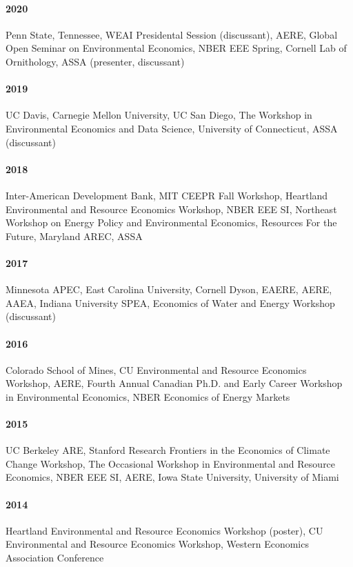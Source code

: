 \documentclass{res} %
\begin{document}
\begin{resume}
\paragraph{2020} Penn State, Tennessee, WEAI Presidental Session (discussant), AERE, Global Open Seminar on Environmental Economics, NBER EEE Spring, Cornell Lab of Ornithology, ASSA (presenter, discussant) \vspace{-.3in}
\paragraph{2019} UC Davis, Carnegie Mellon University, UC San Diego, The Workshop in Environmental Economics and Data Science, University of Connecticut, ASSA (discussant) \vspace{-.3in}
\paragraph{2018} Inter-American Development Bank, MIT CEEPR Fall Workshop, Heartland Environmental and Resource Economics Workshop, NBER EEE SI, Northeast Workshop on Energy Policy and Environmental Economics, Resources For the Future, Maryland AREC, ASSA \vspace{-.3in}
\paragraph{2017} Minnesota APEC, East Carolina University, Cornell Dyson, EAERE, AERE, AAEA, Indiana University SPEA, Economics of Water and Energy Workshop (discussant) \vspace{-.3in}
\paragraph{2016} Colorado School of Mines, CU Environmental and Resource Economics Workshop, AERE, Fourth Annual Canadian Ph.D. and Early Career Workshop in Environmental Economics, NBER Economics of Energy Markets \vspace{-.3in}
\paragraph{2015} UC Berkeley ARE, Stanford Research Frontiers in the Economics of Climate Change Workshop, The Occasional Workshop in Environmental and Resource Economics, NBER EEE SI, AERE, Iowa State University, University of Miami \vspace{-.3in}
\paragraph{2014} Heartland Environmental and Resource Economics Workshop (poster), CU Environmental and Resource Economics Workshop, Western Economics Association Conference



\end{resume}
\end{document}
